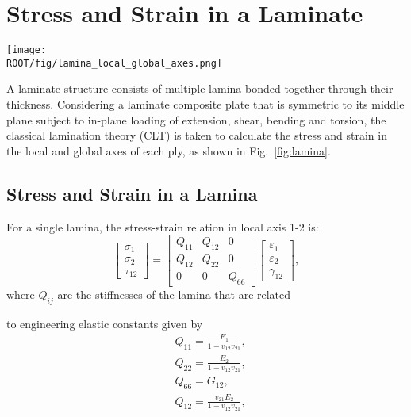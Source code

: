 \section{Stress and Strain in a Laminate}
\begin{figure*}[!htb]
	\centering
	\texttt{[image: \\ROOT/fig/lamina\_local\_global\_axes.png]}
	\caption{Local and global axes of an angle lamina.}
  	\label{fig:lamina}
\end{figure*}


A laminate structure consists of multiple lamina bonded together through their thickness.
Considering a laminate composite plate that is symmetric to its middle plane subject to in-plane
loading of extension, shear, bending and torsion, the classical lamination theory (CLT) is taken to
calculate the stress and strain in the local and global axes of each ply, as shown in
Fig.~\ref{fig:lamina}.




\subsection{Stress and Strain in a Lamina}
For a single lamina, the stress-strain relation in local axis 1-2 is:
\begin{equation}
    \begin{bmatrix}
        \sigma _1\\
        \sigma _2\\
        \tau_{12}
    \end{bmatrix}
    =
    \begin{bmatrix}
        Q_{11} & Q_{12} & 0\\
        Q_{12} & Q_{22} & 0\\
        0      &  0     & Q_{66}
    \end{bmatrix}
    \begin{bmatrix}
        \varepsilon_1\\
        \varepsilon_2\\\gamma_{12}
	\end{bmatrix} \textstyle{,}
\end{equation}
where $Q_{ij} $ are the stiffnesses of the lamina that are related

to engineering elastic constants given by
\begin{equation}
    \begin{split}
    &Q_{11}=\frac{E_1}{1-v_{12}v_{21}}\textstyle{,}\\
    &Q_{22}=\frac{E_2}{1-v_{12}v_{21}}\textstyle{,}\\
    &Q_{66}=G_{12}\textstyle{,}\\
    &Q_{12}=\frac{v_{21}E_2}{1-v_{12}v_{21}}\textstyle{,}\\
    \end{split}
\end{equation}

